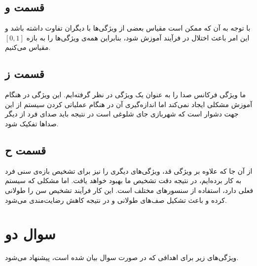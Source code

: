 \documentclass[14pt,a4]{article}
\begin{document}
\subsection*{قسمت و}

با توجه به آن که ممکن است مقیاس بعضی از ویژگی‌ها با دیگران تفاوت داشته باشد و این امر
باعث اختلال در فرآیند آموزش شود، بنابراین همه‌ی ویژگی‌ها را به بازه‌ $[0,1]$ مقیاس می‌کنیم.

\subsection*{قسمت ز}

ما ویژگی فرکانس صدا را به عنوان یک ویژگی در نظر گرفته‌ایم. این ویژگی در هنگام آموزش مشکلی
ایجاد نمی‌کند اما اندازه‌گیری آن در هنگام عملیاتی کردن سیستم از این جهت دشوار است که
شهر‌بازی جای شلوغی است در نتیجه باید صدای فرد از دیگر صدا‌ها تفکیک شود.

\subsection*{قسمت ح}

از آن جا که علاوه بر ویژگی قد، ویژگی‌های دیگری را نیز برای تشخیص بازه‌ی سنی فرد به کار برده‌ایم،
در نتیجه دقت تشخیص ما بهبود خواهد یافت. اما مشکلی که سیستم فعلی دارد، استفاده از سنسور‌های مختلف
است. این کار فرآیند تشخیص سن را طولانی کرده و باعث تشکیل صف‌های طولانی و در نتیجه کاهش رضایت‌مندی
می‌شود.

\section*{سوال دو}

ویژگی‌های زیر برای اهدافی که در صورت سوال بیان شده است، پیشنهاد می‌شود.
\end{document}
